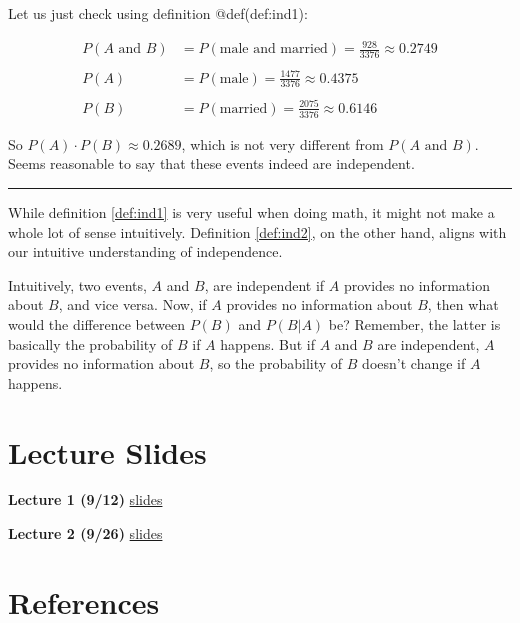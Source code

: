 \documentclass[]{book}
\theoremstyle{definition}
\theoremstyle{definition}
\theoremstyle{definition}
\theoremstyle{remark}
\begin{document}
Let us just check using definition @def(def:ind1):

\begin{align*}
  P(A \text{ and } B) &= P(\text{male and married}) = \frac{928}{3376} \approx 0.2749 \\
  & \\
  P(A) &= P(\text{male}) = \frac{1477}{3376} \approx 0.4375 \\
  & \\
  P(B) &= P(\text{married}) = \frac{2075}{3376} \approx 0.6146
\end{align*}

So \(P(A)\cdot P(B) \approx 0.2689\), which is not very different from \(P(A \text{ and } B)\). Seems reasonable to say that these events indeed are independent.

\begin{center}\rule{0.5\linewidth}{\linethickness}\end{center}

While definition \ref{def:ind1} is very useful when doing math, it might not make a whole lot of sense intuitively. Definition \ref{def:ind2}, on the other hand, aligns with our intuitive understanding of independence.

Intuitively, two events, \(A\) and \(B\), are independent if \(A\) provides no information about \(B\), and vice versa. Now, if \(A\) provides no information about \(B\), then what would the difference between \(P(B)\) and \(P(B|A)\) be? Remember, the latter is basically the probability of \(B\) if \(A\) happens. But if \(A\) and \(B\) are independent, \(A\) provides no information about \(B\), so the probability of \(B\) doesn't change if \(A\) happens.

\hypertarget{appendix-appendix}{%
\appendix}


\hypertarget{lecture-slides}{%
\chapter{Lecture Slides}\label{lecture-slides}}

\textbf{Lecture 1 (9/12)} \href{./lectures/lecture01/lec01_slides.html}{slides}

\textbf{Lecture 2 (9/26)} \href{./lectures/lecture02/lec02_slides.html}{slides}

\hypertarget{references}{%
\chapter*{References}\label{references}}


\end{document}
